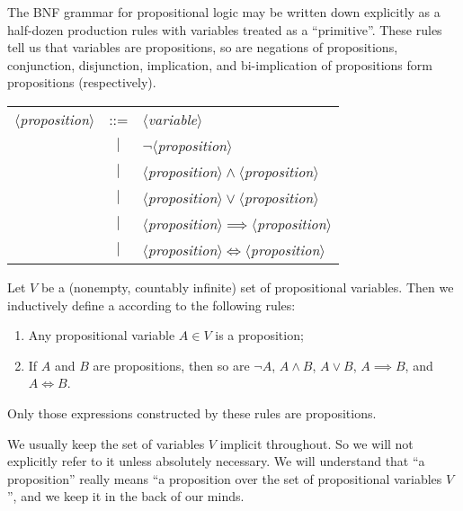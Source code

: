 \begin{node}[Syntax]\label{prop-000J}%
\begin{node}\label{prop-000I}%
The BNF grammar for propositional logic may be written down explicitly
as a half-dozen production rules with variables treated as a
``primitive''. These rules tell us that variables are propositions,
so are negations of propositions, conjunction, disjunction, implication,
and bi-implication of propositions form propositions (respectively).
\begin{center}
\begin{tabular}{rcl}
$\langle$\textit{proposition}$\rangle$ & ::= & $\langle$\textit{variable}$\rangle$\\
& $|$ & $\neg\langle$\textit{proposition}$\rangle$\\
& $|$ & $\langle$\textit{proposition}$\rangle\land\langle$\textit{proposition}$\rangle$\\
& $|$ & $\langle$\textit{proposition}$\rangle\lor\langle$\textit{proposition}$\rangle$\\
& $|$ & $\langle$\textit{proposition}$\rangle\implies\langle$\textit{proposition}$\rangle$\\
& $|$ & $\langle$\textit{proposition}$\rangle\iff\langle$\textit{proposition}$\rangle$\\
\end{tabular}
\end{center}
\end{node}

\begin{node}[Definition]\label{prop-0002}%
Let $V$ be a (nonempty, countably infinite) set of propositional variables. Then
we inductively define a  according to the following
rules:
\begin{enumerate}
\item Any propositional variable $A\in V$ is a proposition;
\item If $A$ and $B$ are propositions, then so are $\neg A$, $A\land B$,
  $A\lor B$, $A\implies B$, and $A\iff B$.
\end{enumerate}
Only those expressions constructed by these rules are propositions.

\begin{node}\label{prop-0003}%
We usually keep the set of variables $V$ implicit throughout. So we will
not explicitly refer to it unless absolutely necessary. We will
understand that ``a proposition'' really means ``a proposition over the
set of propositional variables $V$'', and we keep it in the back of our minds.
\end{node}


\end{node}
\end{node}
